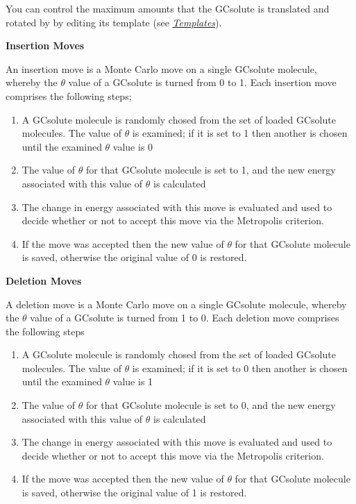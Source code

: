 \documentclass[letterpaper,10pt,english]{sphinxmanual}
\begin{document}
You can control the maximum amounts that the GCsolute is translated and rotated by by editing its template (see {\hyperref[protoms:temref]{\emph{Templates}}}).

\textbf{Insertion Moves}

An insertion move is a Monte Carlo move on a single GCsolute molecule, whereby the \(\theta\) value of a GCsolute is turned from 0 to 1. Each insertion move comprises the following steps;
\begin{enumerate}
\item {} 
A GCsolute molecule is randomly chosed from the set of loaded GCsolute molecules. The value of \(\theta\) is examined; if it is set to 1 then another is chosen until the examined \(\theta\) value is 0

\item {} 
The value of \(\theta\) for that GCsolute molecule is set to 1, and the new energy associated with this value of \(\theta\) is calculated

\item {} 
The change in energy associated with this move is evaluated and used to decide whether or not to accept this move via the Metropolis criterion.

\item {} 
If the move was accepted then the new value of \(\theta\) for that GCsolute molecule is saved, otherwise the original value of 0 is restored.

\end{enumerate}

\textbf{Deletion Moves}

A deletion move is a Monte Carlo move on a single GCsolute molecule, whereby the \(\theta\) value of a GCsolute is turned from 1 to 0. Each deletion move comprises the following steps
\begin{enumerate}
\item {} 
A GCsolute molecule is randomly chosed from the set of loaded GCsolute molecules. The value of \(\theta\) is examined; if it is set to 0 then another is chosen until the examined \(\theta\) value is 1

\item {} 
The value of \(\theta\) for that GCsolute molecule is set to 0, and the new energy associated with this value of \(\theta\) is calculated

\item {} 
The change in energy associated with this move is evaluated and used to decide whether or not to accept this move via the Metropolis criterion.

\item {} 
If the move was accepted then the new value of \(\theta\) for that GCsolute molecule is saved, otherwise the original value of 1 is restored.

\end{enumerate}
\end{document}
